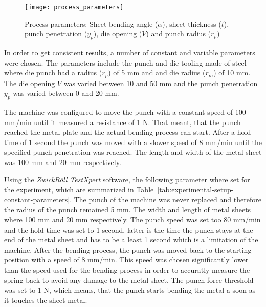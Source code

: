 \begin{figure}[h]
    \begin{tcolorbox}[arc=0pt,boxrule=0.5pt]
        \centering
        \texttt{[image: process\_parameters]}
        \caption{Process parameters: Sheet bending angle ($\alpha$), sheet
        thickness ($t$), punch
        penetration ($y_p$), die opening ($V$) and punch radius ($r_p$)}
        \label{fig:process_parameters}
    \end{tcolorbox}
\end{figure}

In order to get consistent results, a number of constant and variable
parameters were chosen.
The parameters include the punch-and-die tooling made of steel where die
punch had a radius
($r_p$) of 5 mm and and
die radius ($r_m$) of 10 mm. The die opening $V$ was varied between 10 and 50
mm and the punch
penetration $y_p$ was
varied between 0 and 20 mm.

The machine was configured to move the punch with a constant speed of 100
mm/min until it
measured a resistance of 1 N.
That meant, that the punch reached the metal plate and the actual bending
process can start.
After a hold time of 1 second the punch was moved with a slower speed of 8
mm/min until the
specified punch penetration was reached.
The length and width of the metal sheet was 100 mm and 20 mm respectively.

Using the \textit{ZwickRöll TestXpert} software, the following parameter
where set for the
experiment, which are summarized in
Table~\ref{tab:experimental-setup-constant-parameters}.
The punch of the machine was never replaced and therefore the radius of the
punch remained
5 mm.
The width and length of metal sheets where 100 mm and 20 mm respectively.
The punch speed was set too 80 mm/min and the hold time was set to 1 second,
latter is the time
the punch stays at the end of the metal sheet and has to be a least 1 second
which is a limitation
of the machine.
After the bending process, the punch was moved back to the starting position
with a speed of
8 mm/min.
This speed was chosen significantly lower than the speed used for the bending
process
in order to accuratly measure the spring back to avoid any damage to the
metal sheet.
The punch force threshold was set to 1 N, which means, that the punch starts
bending the metal a
soon as it touches the sheet metal.

